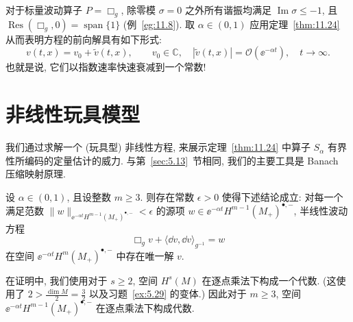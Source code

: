 \begin{example}[标量波动方程的渐近行为]\label{eg:11.25}
对于标量波动算子 $P = \Box_g$, 除零模 $\sigma = 0$ 之外所有谐振均满足 $\operatorname{Im}\sigma \le -1$, 且 $\operatorname{Res}(\Box_g, 0) = \operatorname{span}\{1\}$ (例~\ref{eg:11.8}). 取 $\alpha \in (0, 1)$ 应用定理~\ref{thm:11.24} 从而表明方程的前向解具有如下形式:
\begin{equation}\label{eq:11.121}
    v(t, x) = v_0 + \tilde v(t, x), \qquad v_0 \in \mathbb{C}, \quad |\tilde v(t, x)| = \mathcal{O}(\ee^{-\alpha t}), \quad t \to \infty.
\end{equation}
也就是说, 它们以指数速率快速衰减到一个常数!
\end{example}

\section{非线性玩具模型}\label{sec:11.6}
%
%

我们通过求解一个 (玩具型) 非线性方程, 来展示定理~\ref{thm:11.24} 中算子 $S_\alpha$ 有界性所编码的定量估计的威力. 与第~\ref{sec:5.13}~节相同, 我们的主要工具是 Banach 压缩映射原理.

\begin{theorem}[半线性波动方程]\label{thm:11.26}
设 $\alpha \in (0, 1)$, 且设整数 $m \ge 3$. 则存在常数 $\epsilon > 0$ 使得下述结论成立: 对每一个满足范数 $\|w\|_{\ee^{-\alpha t} H^{m-1}(M_+)^{\bullet, -}} < \epsilon$ 的源项 $w \in \ee^{-\alpha t} H^{m-1}(M_+)^{\bullet, -}$, 半线性波动方程
\begin{equation}\label{eq:11.122}
    \Box_g v + \langle \dd v, \dd v \rangle_{g^{-1}} = w
\end{equation}
在空间 $\ee^{-\alpha t} H^m(M_+)^{\bullet, -}$ 中存在唯一解 $v$.
\end{theorem}

在证明中, 我们使用对于 $s \ge 2$, 空间 $H^s(M)$ 在逐点乘法下构成一个代数. (这使用了 $2 > \frac{\dim M}{2} = \frac{3}{2}$ 以及习题~\ref{ex:5.29} 的变体.) 因此对于 $m \ge 3$, 空间 $\ee^{-\alpha t} H^{m-1}(M_+)^{\bullet, -}$ 在逐点乘法下构成代数.

